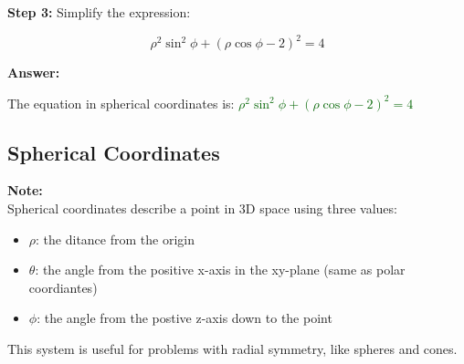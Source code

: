 \documentclass[10pt]{article}                               %
\begin{document}
\begin{adjustwidth}{2em}{0pt}
\begin{adjustwidth}{2em}{0pt}
\begin{examplebox}
\begin{adjustwidth}{2em}{0pt}
                \textbf{Step 3:} Simplify the expression:
                \vspace{0.25em}
            
                \[
                \rho^2\sin^2\phi + (\rho\cos\phi - 2)^2 = 4
                \]
            
                \vspace{0.5em}
            
                \textbf{Answer:}
                \vspace{0.25em}
            
                The equation in spherical coordinates is:  
                \textcolor{darkgreen}{\( \rho^2\sin^2\phi + (\rho\cos\phi - 2)^2 = 4 \)}
            
            \end{adjustwidth}
        
        \end{examplebox}

    \end{adjustwidth}


    \subsection*{Spherical Coordinates}

    \begin{adjustwidth}{2em}{0pt}

        \begin{notebox}

            \textbf{Note:} \\
            Spherical coordinates describe a point in 3D space using three values:
                    
            \begin{itemize}
                \item \( \rho \): the ditance from the origin
                \item \( \theta \): the angle from the positive x-axis in the xy-plane (same as polar coordiantes)
                \item \( \phi \): the angle from the postive z-axis down to the point
            \end{itemize}

            This system is useful for problems with radial symmetry, like spheres and cones.

        \end{notebox}


\end{adjustwidth}
\end{adjustwidth}
\end{document}
